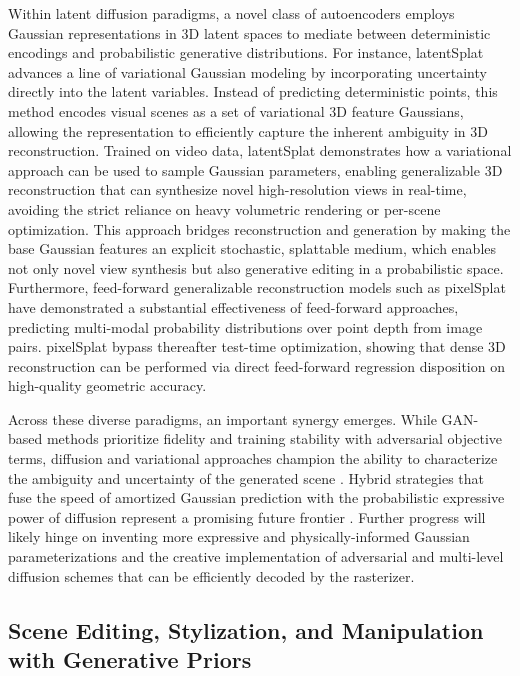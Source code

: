 \documentclass[11pt,a4paper]{article}
\begin{document}
Within latent diffusion paradigms, a novel class of autoencoders employs Gaussian representations in 3D latent spaces to mediate between deterministic encodings and probabilistic generative distributions. For instance, latentSplat \cite{arxiv:2403.16292v1} advances a line of variational Gaussian modeling by incorporating uncertainty directly into the latent variables. Instead of predicting deterministic points, this method encodes visual scenes as a set of variational 3D feature Gaussians, allowing the representation to efficiently capture the inherent ambiguity in 3D reconstruction. Trained on video data, latentSplat demonstrates how a variational approach can be used to sample Gaussian parameters, enabling generalizable 3D reconstruction that can synthesize novel high-resolution views in real-time, avoiding the strict reliance on heavy volumetric rendering or per-scene optimization. This approach bridges reconstruction and generation by making the base Gaussian features an explicit stochastic, splattable medium, which enables not only novel view synthesis but also generative editing in a probabilistic space. Furthermore, feed-forward generalizable reconstruction models such as pixelSplat \cite{arxiv:2312.12337v4} have demonstrated a substantial effectiveness of feed-forward approaches, predicting multi-modal probability distributions over point depth from image pairs. pixelSplat bypass thereafter test-time optimization, showing that dense 3D reconstruction can be performed via direct feed-forward regression disposition on high-quality geometric accuracy.

Across these diverse paradigms, an important synergy emerges. While GAN-based methods prioritize fidelity and training stability with adversarial objective terms, diffusion and variational approaches champion the ability to characterize the ambiguity and uncertainty of the generated scene \cite{arxiv:2403.16292v1}. Hybrid strategies that fuse the speed of amortized Gaussian prediction with the probabilistic expressive power of diffusion \cite{arxiv:2403.16292v1} \cite{arxiv:2401.04099v1} represent a promising future frontier \cite{arxiv:2403.11134v2,arxiv:2401.03890v2}. Further progress will likely hinge on inventing more expressive and physically-informed Gaussian parameterizations and the creative implementation of adversarial and multi-level diffusion schemes that can be efficiently decoded by the rasterizer.


\subsection{Scene Editing, Stylization, and Manipulation with Generative Priors}
\end{document}
